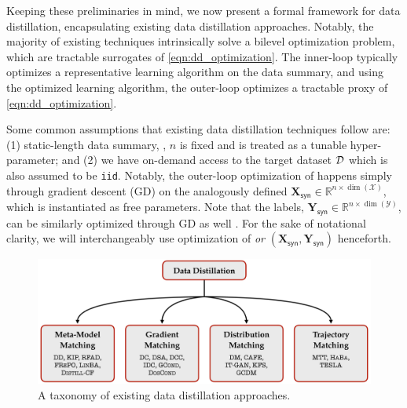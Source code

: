 \documentclass[10pt]{article} %
\begin{document}
Keeping these preliminaries in mind, we now present a formal framework for data distillation, encapsulating existing data distillation approaches. Notably, the majority of existing techniques intrinsically solve a bilevel optimization problem, which are tractable surrogates of \cref{eqn:dd_optimization}. The inner-loop typically optimizes a representative learning algorithm on the data summary, and using the optimized learning algorithm, the outer-loop optimizes a tractable proxy of \cref{eqn:dd_optimization}. 

Some common assumptions that existing data distillation techniques follow are: (1) static-length data summary, \ie, $n$ is fixed and is treated as a tunable hyper-parameter; and (2) we have on-demand access to the target dataset $\mathcal{D}$ which is also assumed to be \texttt{iid}. Notably, the outer-loop optimization of \distill happens simply through gradient descent (GD) on the analogously defined $\mathbf{X}_{\mathsf{syn}} \in \mathbb{R}^{n \times \dim(\mathcal{X})}$, which is instantiated as free parameters. Note that the labels, $\mathbf{Y}_{\mathsf{syn}} \in \mathbb{R}^{n \times \dim(\mathcal{Y})}$, can be similarly optimized through GD as well \citep{label_solve}. For the sake of notational clarity, we will interchangeably use optimization of \distill \emph{or} $(\mathbf{X}_{\mathsf{syn}}, \mathbf{Y}_{\mathsf{syn}})$ henceforth.

\begin{figure}[t!] \centering
    \centering
    \includegraphics[width=0.8\linewidth]{figures/taxonomy.pdf}
    \vspace{4pt}
    \renewcommand\figurename{\href{https://www.noveens.com/images/dd_survey/taxonomy.pdf}{[HQ Image Link]} Figure}
    \caption{A taxonomy of existing data distillation approaches.}
    \label{fig:taxonomy}
\end{figure} 
\end{document}
